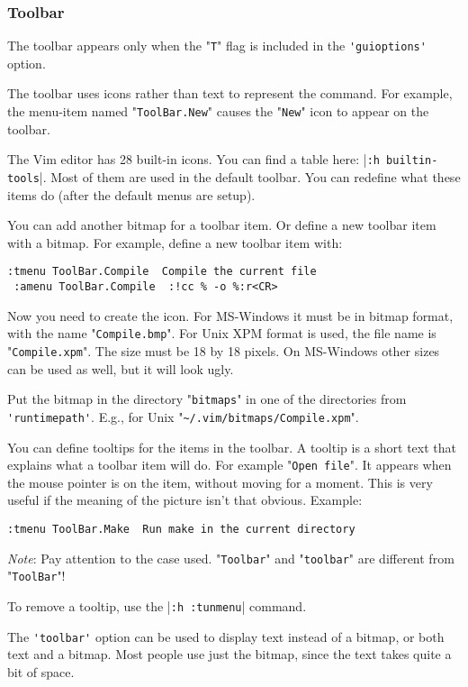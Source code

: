 \subsubsection{Toolbar}
The toolbar appears only when the "\verb!T!" flag is included in the \verb!'guioptions'! option.

The toolbar uses icons rather than text to represent the command.
For example, the {menu-item} named "\verb!ToolBar.New!" causes the "\verb!New!" icon to appear on the toolbar.

The Vim editor has 28 built-in icons.
You can find a table here: |\verb!:h builtin-tools!|.
Most of them are used in the default toolbar.
You can redefine what these items do (after the default menus are setup).

You can add another bitmap for a toolbar item.
Or define a new toolbar item with a bitmap.
For example, define a new toolbar item with:

\begin{Verbatim}[samepage=true]
 :tmenu ToolBar.Compile  Compile the current file
 :amenu ToolBar.Compile  :!cc % -o %:r<CR>
\end{Verbatim}

Now you need to create the icon.
For MS-Windows it must be in bitmap format, with the name "\verb!Compile.bmp!".
For Unix XPM format is used, the file name is "\verb!Compile.xpm!".
The size must be 18 by 18 pixels.
On MS-Windows other sizes can be used as well, but it will look ugly.

Put the bitmap in the directory "\verb!bitmaps!" in one of the directories from \verb!'runtimepath'!.
E.g., for Unix "\verb!~/.vim/bitmaps/Compile.xpm!".

You can define tooltips for the items in the toolbar.
A tooltip is a short text that explains what a toolbar item will do.
For example "\verb!Open file!".
It appears when the mouse pointer is on the item, without moving for a moment.
This is very useful if the meaning of the picture isn't that obvious.
Example:

\begin{Verbatim}[samepage=true]
 :tmenu ToolBar.Make  Run make in the current directory
\end{Verbatim}
 
\emph{Note}: Pay attention to the case used.
"\verb!Toolbar!" and "\verb!toolbar!" are different from "\verb!ToolBar!"!

To remove a tooltip, use the |\verb!:h :tunmenu!| command.

The \verb!'toolbar'! option can be used to display text instead of a bitmap, or both text and a bitmap.
Most people use just the bitmap, since the text takes quite a bit of space.

